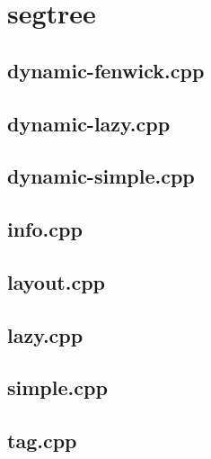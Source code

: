 \section{segtree}

\subsection{dynamic-fenwick.cpp}


\subsection{dynamic-lazy.cpp}


\subsection{dynamic-simple.cpp}


\subsection{info.cpp}


\subsection{layout.cpp}


\subsection{lazy.cpp}


\subsection{simple.cpp}


\subsection{tag.cpp}


